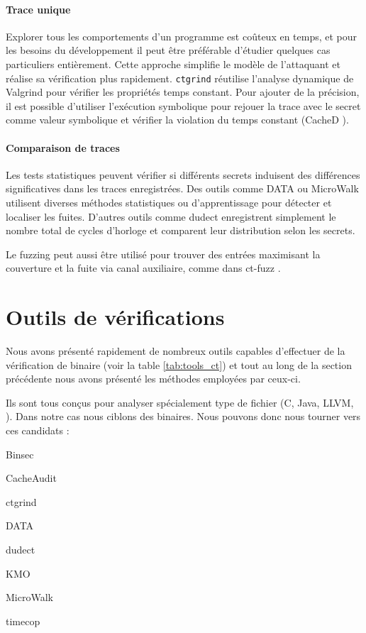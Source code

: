 \paragraph{Trace unique} Explorer tous les comportements d'un programme est coûteux en temps, et pour les besoins du développement il peut être préférable d'étudier quelques cas particuliers entièrement. Cette approche simplifie le modèle de l'attaquant et réalise sa vérification plus rapidement. \texttt{ctgrind} \cite{ctgrind} réutilise l'analyse dynamique de Valgrind pour vérifier les propriétés temps constant. Pour ajouter de la précision, il est possible d'utiliser l'exécution symbolique pour rejouer la trace avec le secret comme valeur symbolique et vérifier la violation du temps constant (CacheD \cite{CacheD}).

\paragraph{Comparaison de traces} Les tests statistiques peuvent vérifier si différents secrets induisent des différences significatives dans les traces enregistrées. Des outils comme DATA \cite{DATA1} ou MicroWalk \cite{MicroWalk} utilisent diverses méthodes statistiques ou d'apprentissage pour détecter et localiser les fuites. D'autres outils comme dudect \cite{dudect} enregistrent simplement le nombre total de cycles d'horloge et comparent leur distribution selon les secrets.

Le fuzzing peut aussi être utilisé pour trouver des entrées maximisant la couverture et la fuite via canal auxiliaire, comme dans ct-fuzz \cite{ctfuzz}.\medbreak


\section{Outils de vérifications}


Nous avons présenté rapidement de nombreux outils capables d'effectuer de la vérification de binaire (voir la table \ref{tab:tools_ct}) et tout au long de la section précédente nous avons présenté les méthodes employées par ceux-ci. \medbreak

Ils sont tous conçus pour analyser spécialement type de fichier (C, Java, LLVM, \etc). Dans notre cas nous ciblons des binaires. Nous pouvons donc nous tourner vers ces candidats :
\begin{itemize}
\begin{multicols}{4}
  \item Binsec
  \item CacheAudit
  \item ctgrind
  \item DATA
  \item dudect
  \item KMO
  \item MicroWalk
  \item timecop
\end{multicols}
\end{itemize}

